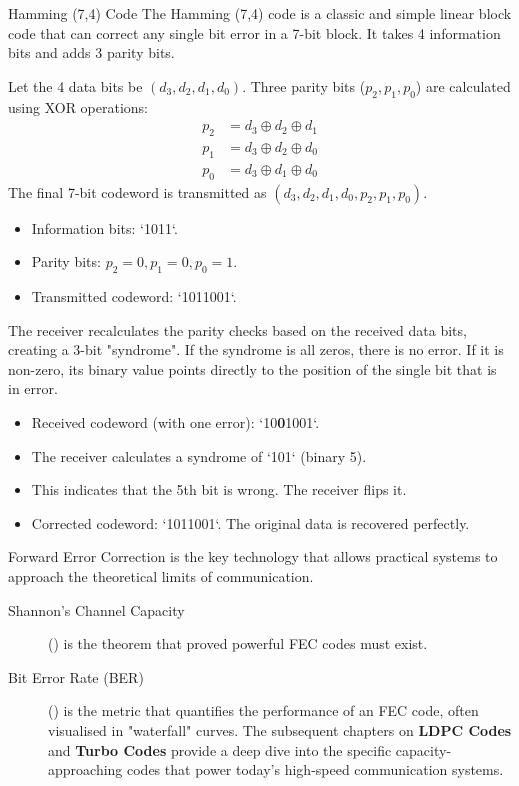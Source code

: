 \begin{workedexample}{Hamming (7,4) Code}
     The Hamming (7,4) code is a classic and simple linear block code that can correct any single bit error in a 7-bit block. It takes 4 information bits and adds 3 parity bits.
    
    Let the 4 data bits be $(d_3, d_2, d_1, d_0)$. Three parity bits ($p_2, p_1, p_0$) are calculated using XOR operations:
    \begin{align*}
        p_2 &= d_3 \oplus d_2 \oplus d_1 \\
        p_1 &= d_3 \oplus d_2 \oplus d_0 \\
        p_0 &= d_3 \oplus d_1 \oplus d_0
    \end{align*}
    The final 7-bit codeword is transmitted as $(d_3, d_2, d_1, d_0, p_2, p_1, p_0)$.

    \begin{itemize}
        \item Information bits: `1011`.
        \item Parity bits: $p_2=0, p_1=0, p_0=1$.
        \item Transmitted codeword: `1011001`.
    \end{itemize}
    
    The receiver recalculates the parity checks based on the received data bits, creating a 3-bit "syndrome". If the syndrome is all zeros, there is no error. If it is non-zero, its binary value points directly to the position of the single bit that is in error.
    \begin{itemize}
        \item Received codeword (with one error): `10\textbf{0}1001`.
        \item The receiver calculates a syndrome of `101` (binary 5).
        \item This indicates that the 5th bit is wrong. The receiver flips it.
        \item Corrected codeword: `1011001`. The original data is recovered perfectly.
    \end{itemize}
\end{workedexample}


\begin{importantbox}[title={Further Reading}]
    Forward Error Correction is the key technology that allows practical systems to approach the theoretical limits of communication.
    \begin{description}
        \item[Shannon's Channel Capacity] () is the theorem that proved powerful FEC codes must exist.
        \item[Bit Error Rate (BER)] () is the metric that quantifies the performance of an FEC code, often visualised in "waterfall" curves.
         The subsequent chapters on \textbf{LDPC Codes} and \textbf{Turbo Codes} provide a deep dive into the specific capacity-approaching codes that power today's high-speed communication systems.
    \end{description}
\end{importantbox}
